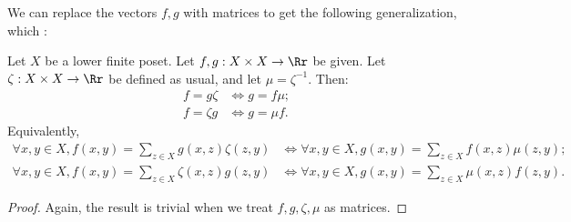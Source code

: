 \documentclass[12pt]{pom_thesis}
\begin{document}
We can replace the vectors $f,g$ with matrices to get the following generalization, which :
\begin{thm}\label{mob_inv_old}
Let $X$ be a lower finite poset.  Let $f,g:X \times X \rightarrow \Rr$ be given. Let $\zeta:X \times X \rightarrow \Rr$ be defined as usual, and let $\mu = \zeta^{-1}$. Then:
\begin{align*}
f = g \zeta &\iff g = f \mu;\\
f = \zeta g &\iff g = \mu f.
\end{align*}
Equivalently,
\begin{align*}
\forall x,y \in X, f(x,y) = \sum_{z \in X}g(x,z)\zeta(z,y) &\iff \forall x,y \in X, g(x,y) = \sum_{z \in X}f(x,z)\mu(z,y);\\
\forall x,y \in X, f(x,y) = \sum_{z \in X}\zeta(x,z)g(z,y) &\iff \forall x,y \in X, g(x,y) = \sum_{z \in X}\mu(x,z)f(z,y).
\end{align*}
\begin{proof}
Again, the result is trivial when we treat $f,g,\zeta,\mu$ as matrices.
\end{proof}
\end{thm}
\end{document}
